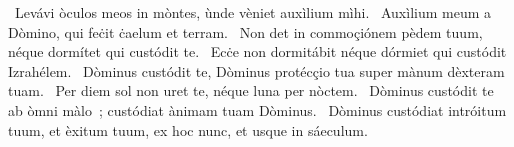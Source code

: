 \psalmChapterWithInscription{}
{ }
{%
~Levávi òculos meos in mòntes, ùnde vèniet auxìlium mìhi. 
~Auxìlium meum a Dòmino, qui feċit ċaelum et terram. 
~Non det in commoçiónem pèdem tuum, néque dormítet qui custódit te. 
~Ecċe non dormitábit néque dórmiet qui custódit Izrahélem. 
~Dòminus custódit te, Dòminus protécçio tua super mànum dèxteram tuam. 
~Per diem sol non uret te, néque luna per nòctem. 
~Dòminus custódit te ab òmni màlo~; custódiat ànimam tuam Dòminus. 
~Dòminus custódiat intróitum tuum, et èxitum tuum, ex hoc nunc, et usque in sáeculum. 
}
